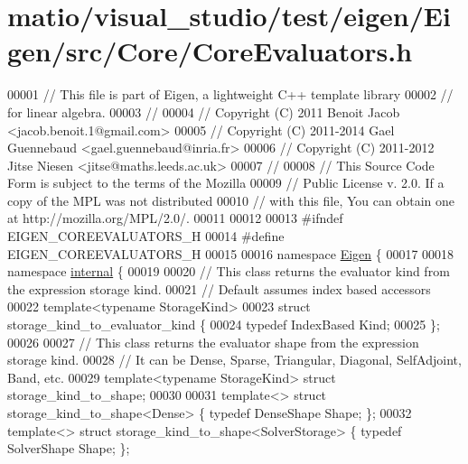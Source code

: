 \hypertarget{matio_2visual__studio_2test_2eigen_2_eigen_2src_2_core_2_core_evaluators_8h_source}{}\section{matio/visual\+\_\+studio/test/eigen/\+Eigen/src/\+Core/\+Core\+Evaluators.h}
\label{matio_2visual__studio_2test_2eigen_2_eigen_2src_2_core_2_core_evaluators_8h_source}

\begin{DoxyCode}
00001 \textcolor{comment}{// This file is part of Eigen, a lightweight C++ template library}
00002 \textcolor{comment}{// for linear algebra.}
00003 \textcolor{comment}{//}
00004 \textcolor{comment}{// Copyright (C) 2011 Benoit Jacob <jacob.benoit.1@gmail.com>}
00005 \textcolor{comment}{// Copyright (C) 2011-2014 Gael Guennebaud <gael.guennebaud@inria.fr>}
00006 \textcolor{comment}{// Copyright (C) 2011-2012 Jitse Niesen <jitse@maths.leeds.ac.uk>}
00007 \textcolor{comment}{//}
00008 \textcolor{comment}{// This Source Code Form is subject to the terms of the Mozilla}
00009 \textcolor{comment}{// Public License v. 2.0. If a copy of the MPL was not distributed}
00010 \textcolor{comment}{// with this file, You can obtain one at http://mozilla.org/MPL/2.0/.}
00011 
00012 
00013 \textcolor{preprocessor}{#ifndef EIGEN\_COREEVALUATORS\_H}
00014 \textcolor{preprocessor}{#define EIGEN\_COREEVALUATORS\_H}
00015 
00016 \textcolor{keyword}{namespace }\hyperlink{namespace_eigen}{Eigen} \{
00017   
00018 \textcolor{keyword}{namespace }\hyperlink{namespaceinternal}{internal} \{
00019 
00020 \textcolor{comment}{// This class returns the evaluator kind from the expression storage kind.}
00021 \textcolor{comment}{// Default assumes index based accessors}
00022 \textcolor{keyword}{template}<\textcolor{keyword}{typename} StorageKind>
00023 \textcolor{keyword}{struct }storage\_kind\_to\_evaluator\_kind \{
00024   \textcolor{keyword}{typedef} IndexBased Kind;
00025 \};
00026 
00027 \textcolor{comment}{// This class returns the evaluator shape from the expression storage kind.}
00028 \textcolor{comment}{// It can be Dense, Sparse, Triangular, Diagonal, SelfAdjoint, Band, etc.}
00029 \textcolor{keyword}{template}<\textcolor{keyword}{typename} StorageKind> \textcolor{keyword}{struct }storage\_kind\_to\_shape;
00030 
00031 \textcolor{keyword}{template}<> \textcolor{keyword}{struct }storage\_kind\_to\_shape<Dense>                  \{ \textcolor{keyword}{typedef} DenseShape Shape;           \};
00032 \textcolor{keyword}{template}<> \textcolor{keyword}{struct }storage\_kind\_to\_shape<SolverStorage>          \{ \textcolor{keyword}{typedef} SolverShape Shape;           \};

\end{DoxyCode}
